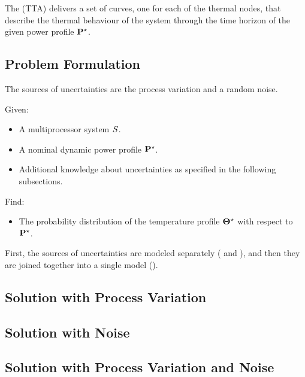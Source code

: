 The  (TTA) delivers a set of curves, one for each of the thermal nodes, that describe the thermal behaviour of the system through the time horizon of the given power profile $\mathbf{P}^\star$.

\subsection{Problem Formulation}
The sources of uncertainties are the process variation and a random noise.

Given:
\begin{itemize}
  \item A multiprocessor system $S$.
  \item A nominal dynamic power profile $\mathbf{P}^\star$.
  \item Additional knowledge about uncertainties as specified in the following subsections.
\end{itemize}

Find:
\begin{itemize}
  \item The probability distribution of the temperature profile $\mathbf{\Theta}^\star$ with respect to $\mathbf{P}^\star$.
\end{itemize}

First, the sources of uncertainties are modeled separately ( and ), and then they are joined together into a single model ().

\subsection{Solution with Process Variation} 


\subsection{Solution with Noise} 


\subsection{Solution with Process Variation and Noise} 

